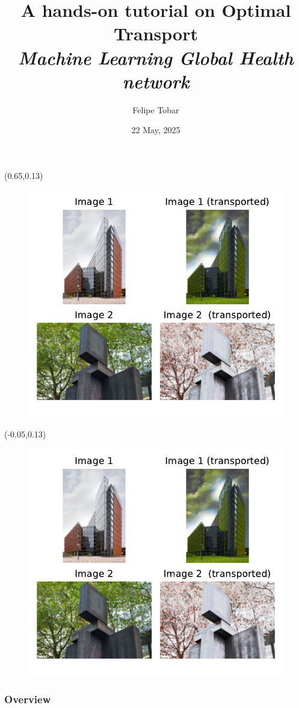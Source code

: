 \documentclass[pdf,aspectratio=169,10pt]{beamer}
\title[Tobar, A hands-on tutorial on Optimal Transport]{A hands-on tutorial on Optimal Transport\\ \vspace{1em} \large{\it Machine Learning Global Health network}
}
\author[]{Felipe Tobar}
\institute[]{Department of Mathematics \& I-X\\ Imperial College London}
\date{22 May, 2025}
\begin{document}
\begin{frame}[plain]
    \titlepage
    \footnotesize

    \begin{textblock}{0.45}(0.65,0.13)
        \begin{figure}
            \includegraphics[trim={7cm 5cm 1cm 1cm},clip, height=0.4\textwidth]{../img/ex1_result.pdf}
        \end{figure}
    \end{textblock}

    \begin{textblock}{0.45}(-0.05,0.13)
        \begin{figure}
            \includegraphics[trim={1cm 5cm 6.5cm 1cm},clip, height=0.4\textwidth]{../img/ex1_result.pdf}
        \end{figure}
    \end{textblock}



\end{frame}


\begin{frame}
    \frametitle{Overview} 
    \tableofcontents
\end{frame}
\end{document}
